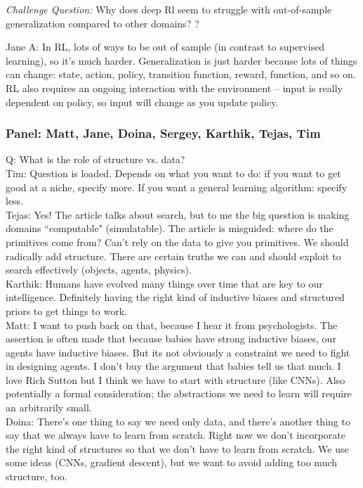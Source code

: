 {\it Challenge Question:} Why does deep Rl seem to struggle with out-of-sample generalization compared to other domains? ?

Jane A: In RL, lots of ways to be out of sample (in contrast to supervised learning), so it's much harder. Generalization is just harder because lots of things can change: state, action, policy, transition function, reward, function, and so on. RL also requires an ongoing interaction with the environment -- input is really dependent on policy, so input will change as you update policy.

\subsubsection{Panel: Matt, Jane, Doina, Sergey, Karthik, Tejas, Tim}

Q: What is the role of structure vs. data? \\

Tim: Question is loaded. Depends on what you want to do: if you want to get good at a niche, specify more. If you want a general learning algorithm: specify less. \\

Tejas: Yes! The article talks about search, but to me the big question is making domains ``computable" (simulatable). The article is misguided: where do the primitives come from? Can't rely on the data to give you primitives. We should radically add structure. There are certain truths we can and should exploit to search effectively (objects, agents, physics). \\

Karthik: Humans have evolved many things over time that are key to our intelligence. Definitely having the right kind of inductive biases and structured priors to get things to work.  \\

Matt: I want to push back on that, because I hear it from psychologists. The assertion is often made that because babies have strong inductive biases, our agents have inductive biases. But its not obviously a constraint we need to fight in designing agents. I don't buy the argument that babies tell us that much. I love Rich Sutton but I think we have to start with structure (like CNNs). Also potentially a formal consideration; the abstractions we need to learn will require an arbitrarily small. \\

Doina: There's one thing to say we need only data, and there's another thing to say that we always have to learn from scratch. Right now we don't incorporate the right kind of structures so that we don't have to learn from scratch. We use some ideas (CNNs, gradient descent), but we want to avoid adding too much structure, too. \\

